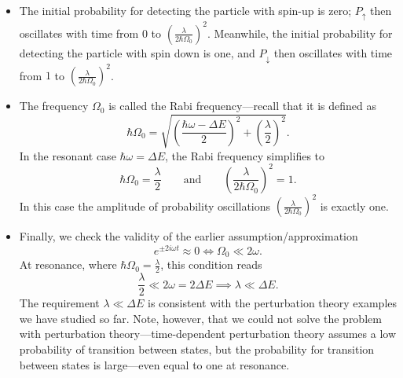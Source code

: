 \documentclass[11pt, a4paper]{article}
\newcommand{\eqtext}[1]{\qquad \text{#1} \qquad}
\newcommand{\ua}{\uparrow}  %
\newcommand{\da}{\downarrow}  %
\begin{document}
\begin{itemize}
	\item The initial probability for detecting the particle with spin-up is zero; $ P_{\ua} $ then oscillates with time from $ 0 $ to $ \left(\frac{\lambda}{2\hbar \Omega_{0}}\right)^{2} $. Meanwhile, the initial probability for detecting the particle with spin down is one, and $ P_{\da} $  then oscillates with time from $ 1 $ to $ \left(\frac{\lambda}{2\hbar \Omega_{0}}\right)^{2} $.
	
	\item The frequency $ \Omega_{0} $ is called the Rabi frequency---recall that it is defined as
	\begin{equation*}
		\hbar \Omega_{0} = \sqrt{\left(\frac{\hbar \omega - \Delta E}{2}\right)^{2} + \left(\frac{\lambda}{2}\right)^{2}}.
	\end{equation*}
	In the resonant case $ \hbar \omega = \Delta E $, the Rabi frequency simplifies to
	\begin{equation*}
		\hbar \Omega_{0} = \frac{\lambda}{2} \eqtext{and} \left(\frac{\lambda}{2\hbar \Omega_{0}}\right)^{2} = 1.
	\end{equation*}
	In this case the amplitude of probability oscillations $ \left(\frac{\lambda}{2\hbar \Omega_{0}}\right)^{2} $ is exactly one.
	
	\item Finally, we check the validity of the earlier assumption/approximation 
	\begin{equation*}
		e^{\pm 2i\omega t} \approx 0 \iff \Omega_{0} \ll 2 \omega.
	\end{equation*}
	At resonance, where $ \hbar \Omega_{0} = \frac{\lambda}{2} $, this condition reads
	\begin{equation*}
		\frac{\lambda}{2} \ll 2 \omega = 2 \Delta E \implies \lambda \ll \Delta E.
	\end{equation*}
	The requirement $ \lambda \ll \Delta E $ is consistent with the perturbation theory examples we have studied so far. Note, however, that we could not solve the problem with perturbation theory---time-dependent perturbation theory assumes a low probability of transition between states, but the probability for transition between states is large---even equal to one at resonance.
	
\end{itemize}
\end{document}
